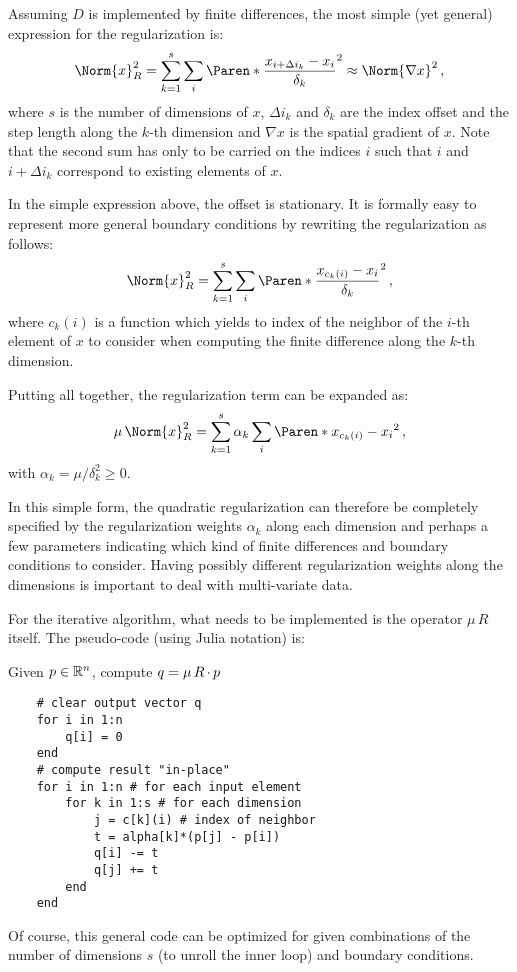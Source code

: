 \documentclass[9pt,a4paper,twocolumn]{article}
\renewcommand*{\cdot}{\mathord{\,\mathchar"2201\,}}
\begin{document}
Assuming $D$ is implemented by finite differences, the most simple (yet
general) expression for the regularization is:
\begin{equation}
  \Norm{x}_{R}^2 =
  \sum_{k=1}^{s} \sum_{i}
  \Paren*{\frac{x_{i + \Delta i_k} - x_{i}}{\delta_k}}^2
  \approx \Norm{\nabla x}^2 \, ,
  \label{eq:simple-regul}
\end{equation}
where $s$ is the number of dimensions of $x$, $\Delta i_k$ and $\delta_k$ are
the index offset and the step length along the $k$-th dimension and $\nabla x$
is the spatial gradient of $x$.  Note that the second sum has only to be
carried on the indices $i$ such that $i$ and $i + \Delta i_k$ correspond to
existing elements of $x$.

In the simple expression above, the offset is stationary.  It is formally easy
to represent more general boundary conditions by rewriting the regularization
as follows:
\begin{equation}
  \Norm{x}_{R}^2 =
  \sum_{k=1}^{s} \sum_{i}
  \Paren*{\frac{x_{c_k(i)} - x_{i}}{\delta_k}}^2 \, ,
  \label{eq:regul-with-boundary-conditions}
\end{equation}
where $c_k(i)$ is a function which yields to index of the neighbor of the
$i$-th element of $x$ to consider when computing the finite difference along
the $k$-th dimension.

Putting all together, the regularization term can be expanded as:
\begin{equation}
  \mu \, \Norm{x}_{R}^2 =
  \sum_{k=1}^{s} \alpha_k \sum_{i}
  \Paren*{x_{c_k(i)} - x_{i}}^2 \, ,
  \label{eq:gen-regul}
\end{equation}
with $\alpha_k = \mu/\delta_k^2 \ge 0$.

In this simple form, the quadratic regularization can therefore be completely
specified by the regularization weights $\alpha_k$ along each dimension and
perhaps a few parameters indicating which kind of finite differences and
boundary conditions to consider.  Having possibly different regularization
weights along the dimensions is important to deal with multi-variate data.

For the iterative algorithm, what needs to be implemented is the operator $\mu
\, R$ itself.  The pseudo-code (using Julia notation) is:
\begin{algolist}
\item[] Given $p \in \mathbb{R}^{n}$, compute $q = \mu \, R \cdot p$
\begin{verbatim}
    # clear output vector q
    for i in 1:n
        q[i] = 0
    end
    # compute result "in-place"
    for i in 1:n # for each input element
        for k in 1:s # for each dimension
            j = c[k](i) # index of neighbor
            t = alpha[k]*(p[j] - p[i])
            q[i] -= t
            q[j] += t
        end
    end
\end{verbatim}
\end{algolist}
Of course, this general code can be optimized for given combinations of the
number of dimensions $s$ (to unroll the inner loop) and boundary conditions.
\end{document}
